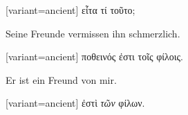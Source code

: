 \begin{greek}[variant=ancient]%
εἶτα τί τοῦτο;

\end{greek}%
\switchcolumn*

Seine Freunde vermissen ihn schmerzlich. 

\switchcolumn

\begin{greek}[variant=ancient]%
ποθεινός ἐστι τοῖς φίλοις.

\end{greek}%
\switchcolumn*

Er ist ein Freund von mir. 

\switchcolumn

\begin{greek}[variant=ancient]%
ἐστὶ \emph{τῶν} φίλων.

\end{greek}%
